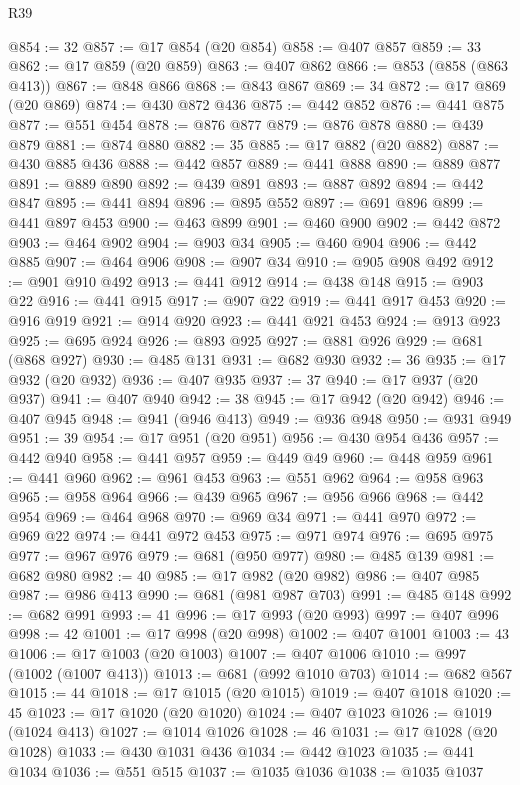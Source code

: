 \begin{lexlean}{R39}
\begin{coremodule}
@854 := 32
@857 := @17 @854 (@20 @854)
@858 := @407 @857
@859 := 33
@862 := @17 @859 (@20 @859)
@863 := @407 @862
@866 := @853 (@858 (@863 @413))
@867 := @848 @866
@868 := @843 @867
@869 := 34
@872 := @17 @869 (@20 @869)
@874 := @430 @872 @436
@875 := @442 @852
@876 := @441 @875
@877 := @551 @454
@878 := @876 @877
@879 := @876 @878
@880 := @439 @879
@881 := @874 @880
@882 := 35
@885 := @17 @882 (@20 @882)
@887 := @430 @885 @436
@888 := @442 @857
@889 := @441 @888
@890 := @889 @877
@891 := @889 @890
@892 := @439 @891
@893 := @887 @892
@894 := @442 @847
@895 := @441 @894
@896 := @895 @552
@897 := @691 @896
@899 := @441 @897 @453
@900 := @463 @899
@901 := @460 @900
@902 := @442 @872
@903 := @464 @902
@904 := @903 @34
@905 := @460 @904
@906 := @442 @885
@907 := @464 @906
@908 := @907 @34
@910 := @905 @908 @492
@912 := @901 @910 @492
@913 := @441 @912
@914 := @438 @148
@915 := @903 @22
@916 := @441 @915
@917 := @907 @22
@919 := @441 @917 @453
@920 := @916 @919
@921 := @914 @920
@923 := @441 @921 @453
@924 := @913 @923
@925 := @695 @924
@926 := @893 @925
@927 := @881 @926
@929 := @681 (@868 @927)
@930 := @485 @131
@931 := @682 @930
@932 := 36
@935 := @17 @932 (@20 @932)
@936 := @407 @935
@937 := 37
@940 := @17 @937 (@20 @937)
@941 := @407 @940
@942 := 38
@945 := @17 @942 (@20 @942)
@946 := @407 @945
@948 := @941 (@946 @413)
@949 := @936 @948
@950 := @931 @949
@951 := 39
@954 := @17 @951 (@20 @951)
@956 := @430 @954 @436
@957 := @442 @940
@958 := @441 @957
@959 := @449 @49
@960 := @448 @959
@961 := @441 @960
@962 := @961 @453
@963 := @551 @962
@964 := @958 @963
@965 := @958 @964
@966 := @439 @965
@967 := @956 @966
@968 := @442 @954
@969 := @464 @968
@970 := @969 @34
@971 := @441 @970
@972 := @969 @22
@974 := @441 @972 @453
@975 := @971 @974
@976 := @695 @975
@977 := @967 @976
@979 := @681 (@950 @977)
@980 := @485 @139
@981 := @682 @980
@982 := 40
@985 := @17 @982 (@20 @982)
@986 := @407 @985
@987 := @986 @413
@990 := @681 (@981 @987 @703)
@991 := @485 @148
@992 := @682 @991
@993 := 41
@996 := @17 @993 (@20 @993)
@997 := @407 @996
@998 := 42
@1001 := @17 @998 (@20 @998)
@1002 := @407 @1001
@1003 := 43
@1006 := @17 @1003 (@20 @1003)
@1007 := @407 @1006
@1010 := @997 (@1002 (@1007 @413))
@1013 := @681 (@992 @1010 @703)
@1014 := @682 @567
@1015 := 44
@1018 := @17 @1015 (@20 @1015)
@1019 := @407 @1018
@1020 := 45
@1023 := @17 @1020 (@20 @1020)
@1024 := @407 @1023
@1026 := @1019 (@1024 @413)
@1027 := @1014 @1026
@1028 := 46
@1031 := @17 @1028 (@20 @1028)
@1033 := @430 @1031 @436
@1034 := @442 @1023
@1035 := @441 @1034
@1036 := @551 @515
@1037 := @1035 @1036
@1038 := @1035 @1037

\end{coremodule}
\end{lexlean}
